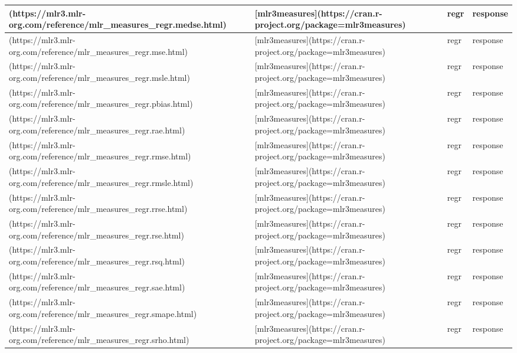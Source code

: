 \documentclass[
]{scrbook}
\begin{document}
\begin{tabular}{l|l|l|l}
\hline
[`regr.medse`](https://mlr3.mlr-org.com/reference/mlr\_measures\_regr.medse.html) & [mlr3measures](https://cran.r-project.org/package=mlr3measures) & regr & response\\
\hline
[`regr.mse`](https://mlr3.mlr-org.com/reference/mlr\_measures\_regr.mse.html) & [mlr3measures](https://cran.r-project.org/package=mlr3measures) & regr & response\\
\hline
[`regr.msle`](https://mlr3.mlr-org.com/reference/mlr\_measures\_regr.msle.html) & [mlr3measures](https://cran.r-project.org/package=mlr3measures) & regr & response\\
\hline
[`regr.pbias`](https://mlr3.mlr-org.com/reference/mlr\_measures\_regr.pbias.html) & [mlr3measures](https://cran.r-project.org/package=mlr3measures) & regr & response\\
\hline
[`regr.rae`](https://mlr3.mlr-org.com/reference/mlr\_measures\_regr.rae.html) & [mlr3measures](https://cran.r-project.org/package=mlr3measures) & regr & response\\
\hline
[`regr.rmse`](https://mlr3.mlr-org.com/reference/mlr\_measures\_regr.rmse.html) & [mlr3measures](https://cran.r-project.org/package=mlr3measures) & regr & response\\
\hline
[`regr.rmsle`](https://mlr3.mlr-org.com/reference/mlr\_measures\_regr.rmsle.html) & [mlr3measures](https://cran.r-project.org/package=mlr3measures) & regr & response\\
\hline
[`regr.rrse`](https://mlr3.mlr-org.com/reference/mlr\_measures\_regr.rrse.html) & [mlr3measures](https://cran.r-project.org/package=mlr3measures) & regr & response\\
\hline
[`regr.rse`](https://mlr3.mlr-org.com/reference/mlr\_measures\_regr.rse.html) & [mlr3measures](https://cran.r-project.org/package=mlr3measures) & regr & response\\
\hline
[`regr.rsq`](https://mlr3.mlr-org.com/reference/mlr\_measures\_regr.rsq.html) & [mlr3measures](https://cran.r-project.org/package=mlr3measures) & regr & response\\
\hline
[`regr.sae`](https://mlr3.mlr-org.com/reference/mlr\_measures\_regr.sae.html) & [mlr3measures](https://cran.r-project.org/package=mlr3measures) & regr & response\\
\hline
[`regr.smape`](https://mlr3.mlr-org.com/reference/mlr\_measures\_regr.smape.html) & [mlr3measures](https://cran.r-project.org/package=mlr3measures) & regr & response\\
\hline
[`regr.srho`](https://mlr3.mlr-org.com/reference/mlr\_measures\_regr.srho.html) & [mlr3measures](https://cran.r-project.org/package=mlr3measures) & regr & response\\

\end{tabular}
\end{document}

